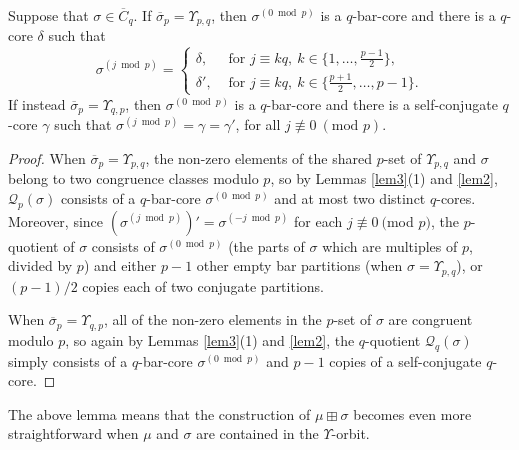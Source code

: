 \documentclass[ALCO, Unicode,published]{cedram}
\newcommand*\nicefrac[2]{#1/#2}
\begin{document}
\begin{lemm}\label{sig2}
Suppose that $\sigma\in\overline{C}_q$. If $\overline{\sigma}_p=\Upsilon_{p,q}$, then $\sigma^{(0\bmod p)}$ is a $q$-bar-core and there is a $q$-core $\delta$ such that 
$$\sigma^{(j\bmod p)}=\begin{cases}\delta,&\text{ for }j\equiv kq,\:k\in\{1,\dots,\tfrac{p-1}{2}\},\\
\delta',&\text{ for }j\equiv kq,\:k\in\{\tfrac{p+1}{2},\dots,p-1\}.\end{cases}$$ 
If instead $\overline{\sigma}_p=\Upsilon_{q,p}$, then $\sigma^{(0\bmod p)}$ is a $q$-bar-core and there is a self-conjugate $q$-core $\gamma$ such that $\sigma^{(j\bmod p)}=\gamma=\gamma'$, for all $j\not\equiv0\:(\text{mod }p)$. 
\end{lemm}
\begin{proof}
When $\overline{\sigma}_p=\Upsilon_{p,q}$, the non-zero elements of the shared $p$-set of $\Upsilon_{p,q}$ and $\sigma$ belong to two congruence classes modulo $p$, so by Lemmas \ref{lem3}(1) and \ref{lem2}, $\mathcal{Q}_p(\sigma)$ consists of a $q$-bar-core $\sigma^{(0\bmod p)}$ and at most two distinct $q$-cores. Moreover, since $(\sigma^{(j\bmod p)})'=\sigma^{(-j\bmod p)}$ for each $j\not\equiv0\:($mod $p)$, the $p$-quotient of $\sigma$ consists of $\sigma^{(0\bmod p)}$ (the parts of $\sigma$ which are multiples of $p$, divided by $p$) and either $p-1$ other empty bar partitions (when $\sigma=\Upsilon_{p,q}$), or $\nicefrac{(p-1)}{2}$ copies each of two conjugate partitions. 

When $\overline{\sigma}_p=\Upsilon_{q,p}$, all of the non-zero elements in the $p$-set of $\sigma$ are congruent modulo $p$, so again by Lemmas \ref{lem3}(1) and \ref{lem2}, the $q$-quotient $\mathcal{Q}_q(\sigma)$ simply consists of a $q$-bar-core $\sigma^{(0\bmod p)}$ and $p-1$ copies of a self-conjugate $q$-core. 
\end{proof}

The above lemma means that the construction of $\mu\boxplus\sigma$ becomes even more straightforward when $\mu$ and $\sigma$ are contained in the $\Upsilon$-orbit. 
\end{document}
